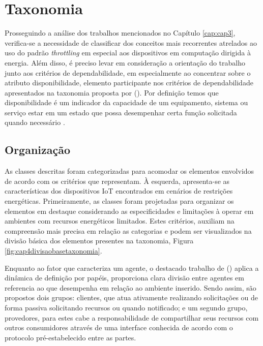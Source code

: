 \chapter{Taxonomia}
\label{cap:cap4}

Prosseguindo a análise dos trabalhos mencionados no Capítulo \ref{cap:cap3}, verifica-se a necessidade de classificar dos conceitos mais recorrentes atrelados ao uso do padrão \textit{throttling} em especial aos dispositivos em computação dirigida à energia. Além disso, é preciso levar em consideração a orientação do trabalho junto aos critérios de dependabilidade, em especialmente ao concentrar sobre o atributo disponibilidade, elemento participante nos critérios de dependabilidade apresentados na taxonomia proposta por \citeauthor{avizienis_basic_2004} (\citeyear{avizienis_basic_2004}). Por definição temos que disponibilidade é um indicador da capacidade de um equipamento, sistema ou serviço estar em um estado que possa desempenhar certa função solicitada quando necessário \cite{ISO9000}. 


\section{Organização}

As classes descritas foram categorizadas para acomodar os elementos envolvidos de acordo com os critérios que representam. À esquerda, apresenta-se as características dos dispositivos \acs{IoT} encontrados em cenários de restrições energéticas. Primeiramente, as classes foram projetadas para organizar os elementos em destaque considerando as especificidades e limitações à operar em ambientes com recursos energéticos limitados. Estes critérios, auxiliam na compreensão mais precisa em relação as categorias e podem ser visualizados na divisão básica dos elementos presentes na taxonomia, Figura \ref{fig:cap4divisaobasetaxonomia}. 

Enquanto ao fator que caracteriza um agente, o destacado trabalho de \citeauthor{avizienis_basic_2004} (\citeyear{avizienis_basic_2004}) aplica a dinâmica de definição por papéis, proporciona clara divisão entre agentes em referencia ao que desempenha em relação ao ambiente inserido. Sendo assim, são propostos dois grupos: clientes, que atua ativamente realizando solicitações ou de forma passiva solicitando recursos ou quando notificado; e um segundo grupo, provedores, para estes cabe a responsabilidade de compartilhar seus recursos com outros consumidores através de uma interface conhecida de acordo com o protocolo pré-estabelecido entre as partes.


